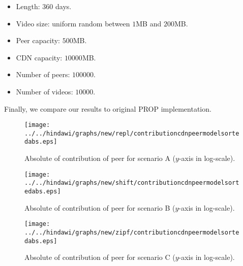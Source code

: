 \begin{itemize}
\item Length: $360$ days.
\item Video size: uniform random between $1$MB and $200$MB.
\item Peer capacity: $500$MB.
\item CDN capacity: $10000$MB.
\item Number of peers: $100000$.
\item Number of videos: $10000$.
\end{itemize}
Finally, we compare our results to original PROP \cite{1613869} implementation.






\begin{figure}[!t]
\begin{center}
\texttt{[image: ../../hindawi/graphs/new/repl/contributioncdnpeermodelsortedabs.eps]}
\end{center}
\caption{Absolute of contribution of peer for scenario A ($y$-axis in log-scale).}
\label{fig:contrib-normal}
\end{figure}


\begin{figure}[!t]
\begin{center}
\texttt{[image: ../../hindawi/graphs/new/shift/contributioncdnpeermodelsortedabs.eps]}
\end{center}
\caption{Absolute of contribution of peer for scenario B ($y$-axis in log-scale).}
\label{fig:contrib-shift}
\end{figure}


\begin{figure}[!t]
\begin{center}
\texttt{[image: ../../hindawi/graphs/new/zipf/contributioncdnpeermodelsortedabs.eps]}
\end{center}
\caption{Absolute of contribution of peer for scenario C ($y$-axis in log-scale).}
\label{fig:contrib-zipf}
\end{figure}




